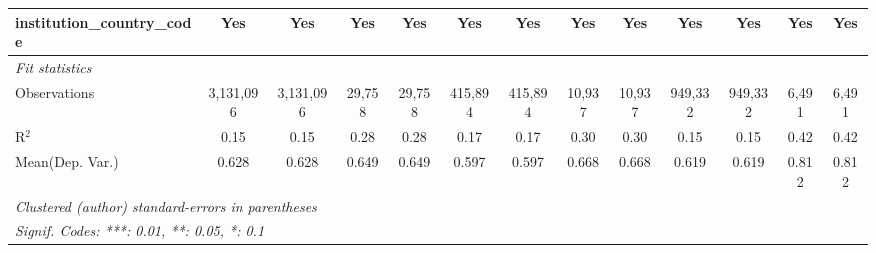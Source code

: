 \begin{tabular}{lcccccccccccc}
   institution\_country\_code               & Yes           & Yes             & Yes           & Yes             & Yes           & Yes             & Yes           & Yes            & Yes           & Yes             & Yes          & Yes\\  
   \midrule
   \emph{Fit statistics}\\
   Observations                             & 3,131,096     & 3,131,096       & 29,758        & 29,758          & 415,894       & 415,894         & 10,937        & 10,937         & 949,332       & 949,332         & 6,491        & 6,491\\  
   R$^2$                                    & 0.15          & 0.15            & 0.28          & 0.28            & 0.17          & 0.17            & 0.30          & 0.30           & 0.15          & 0.15            & 0.42         & 0.42\\  
Mean(Dep. Var.) & 0.628 & 0.628 & 0.649 & 0.649 & 0.597 & 0.597 & 0.668 & 0.668 & 0.619 & 0.619 & 0.812 & 0.812 \\
   \midrule \midrule
   \multicolumn{13}{l}{\emph{Clustered (author) standard-errors in parentheses}}\\
   \multicolumn{13}{l}{\emph{Signif. Codes: ***: 0.01, **: 0.05, *: 0.1}}\\
\end{tabular}
\par\endgroup
